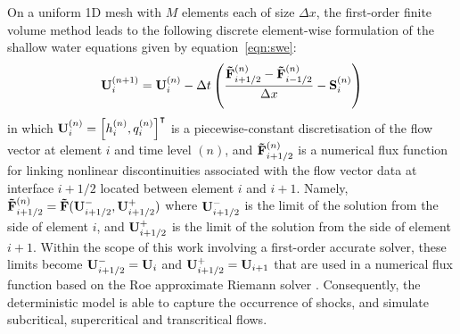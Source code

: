 On a uniform 1D mesh with $M$ elements each of size $\Delta x$, the first-order finite volume method leads to the following discrete element-wise formulation of the shallow water equations given by equation~\eqref{eqn:swe}:
\begin{align}
    \mathbf{U}_i^{(n+1)} = \mathbf{U}_i^{(n)} - \Delta t
    \left(
    \frac{\mathbf{\tilde{F}}_{i+1/2}^{(n)} - \mathbf{\tilde{F}}_{i-1/2}^{(n)}}{\Delta x}
    - \mathbf{S}_i^{(n)} \right) \label{eqn:swe-discrete}
\end{align}
in which $\mathbf{U}_i^{(n)} = \left[ h_i^{(n)}, q_i^{(n)} \right]^\intercal$ is a piecewise-constant discretisation of the flow vector at element $i$ and time level $(n)$, and $\mathbf{\tilde{F}}_{i+1/2}^{(n)}$ is a numerical flux function for linking nonlinear discontinuities associated with the flow vector data at interface $i+1/2$ located between element $i$ and $i + 1$.
Namely, $\mathbf{\tilde{F}}_{i+1/2}^{(n)} = \mathbf{\tilde{F}}(\mathbf{U}_{i+1/2}^-, \mathbf{U}_{i+1/2}^+)$ where $\mathbf{U}_{i+1/2}^-$ is the limit of the solution from the side of element $i$, and $\mathbf{U}_{i+1/2}^+$ is the limit of the solution from the side of element $i+1$.
Within the scope of this work involving a first-order accurate solver, these limits become $\mathbf{U}_{i+1/2}^- = \mathbf{U}_i$ and $\mathbf{U}_{i+1/2}^+ = \mathbf{U}_{i+1}$ that are used in a numerical flux function based on the Roe approximate Riemann solver \citep{roe-pike1984}.
Consequently, the deterministic model is able to capture the occurrence of shocks, and simulate subcritical, supercritical and transcritical flows.

